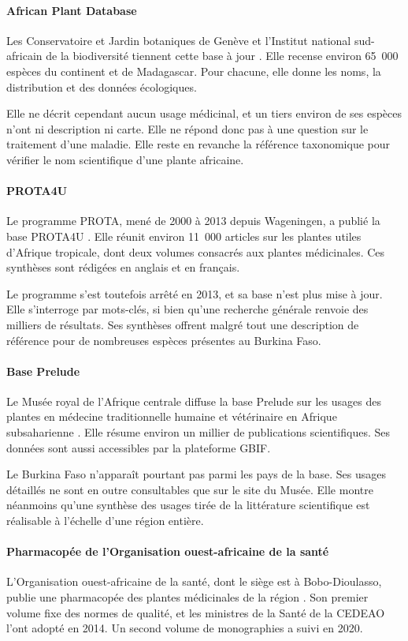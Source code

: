 \paragraph{African Plant Database}
Les Conservatoire et Jardin botaniques de Genève et l'Institut national sud-africain de la biodiversité tiennent cette base à jour \cite{african_plant_database}. Elle recense environ 65~000 espèces du continent et de Madagascar. Pour chacune, elle donne les noms, la distribution et des données écologiques.

Elle ne décrit cependant aucun usage médicinal, et un tiers environ de ses espèces n'ont ni description ni carte. Elle ne répond donc pas à une question sur le traitement d'une maladie. Elle reste en revanche la référence taxonomique pour vérifier le nom scientifique d'une plante africaine.

\paragraph{PROTA4U}
Le programme PROTA, mené de 2000 à 2013 depuis Wageningen, a publié la base PROTA4U \cite{prota4u}. Elle réunit environ 11~000 articles sur les plantes utiles d'Afrique tropicale, dont deux volumes consacrés aux plantes médicinales. Ces synthèses sont rédigées en anglais et en français.

Le programme s'est toutefois arrêté en 2013, et sa base n'est plus mise à jour. Elle s'interroge par mots-clés, si bien qu'une recherche générale renvoie des milliers de résultats. Ses synthèses offrent malgré tout une description de référence pour de nombreuses espèces présentes au Burkina Faso.

\paragraph{Base Prelude}
Le Musée royal de l'Afrique centrale diffuse la base Prelude sur les usages des plantes en médecine traditionnelle humaine et vétérinaire en Afrique subsaharienne \cite{prelude_rmca}. Elle résume environ un millier de publications scientifiques. Ses données sont aussi accessibles par la plateforme GBIF.

Le Burkina Faso n'apparaît pourtant pas parmi les pays de la base. Ses usages détaillés ne sont en outre consultables que sur le site du Musée. Elle montre néanmoins qu'une synthèse des usages tirée de la littérature scientifique est réalisable à l'échelle d'une région entière.

\paragraph{Pharmacopée de l'Organisation ouest-africaine de la santé}
L'Organisation ouest-africaine de la santé, dont le siège est à Bobo-Dioulasso, publie une pharmacopée des plantes médicinales de la région \cite{waho_pharmacopoeia}. Son premier volume fixe des normes de qualité, et les ministres de la Santé de la CEDEAO l'ont adopté en 2014. Un second volume de monographies a suivi en 2020.

